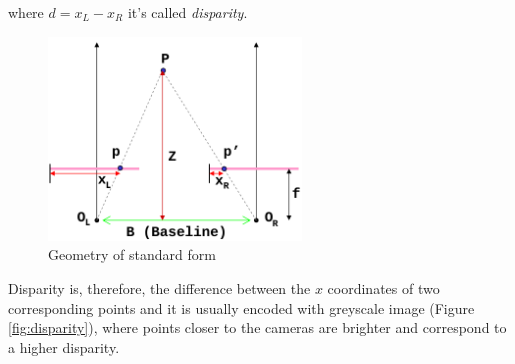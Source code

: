 where $ d = x_{L} - x_{R} $ it's called \textit{disparity}.\\
\begin{figure}[h!]
\centering
\includegraphics[width=0.6\textwidth]{./img/depth.png}
\caption{\small{Geometry of standard form}}
\label{fig:depth}
\end{figure}
Disparity is, therefore, the difference between the $x$ coordinates of two corresponding points and it is usually encoded with greyscale image (Figure \ref{fig:disparity}), where points closer to the cameras are brighter and correspond to a higher disparity.\\
